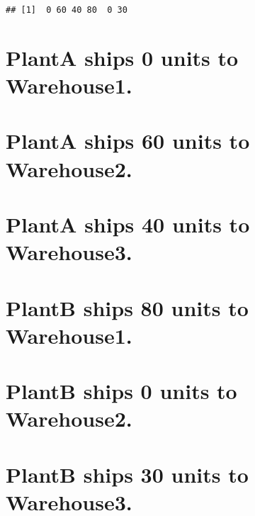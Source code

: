 \documentclass[
]{article}
\begin{document}
\begin{verbatim}
## [1]  0 60 40 80  0 30
\end{verbatim}

\hypertarget{planta-ships-0-units-to-warehouse1.}{%
\section{PlantA ships 0 units to
Warehouse1.}\label{planta-ships-0-units-to-warehouse1.}}

\hypertarget{planta-ships-60-units-to-warehouse2.}{%
\section{PlantA ships 60 units to
Warehouse2.}\label{planta-ships-60-units-to-warehouse2.}}

\hypertarget{planta-ships-40-units-to-warehouse3.}{%
\section{PlantA ships 40 units to
Warehouse3.}\label{planta-ships-40-units-to-warehouse3.}}

\hypertarget{plantb-ships-80-units-to-warehouse1.}{%
\section{PlantB ships 80 units to
Warehouse1.}\label{plantb-ships-80-units-to-warehouse1.}}

\hypertarget{plantb-ships-0-units-to-warehouse2.}{%
\section{PlantB ships 0 units to
Warehouse2.}\label{plantb-ships-0-units-to-warehouse2.}}

\hypertarget{plantb-ships-30-units-to-warehouse3.}{%
\section{PlantB ships 30 units to
Warehouse3.}\label{plantb-ships-30-units-to-warehouse3.}}
\end{document}
